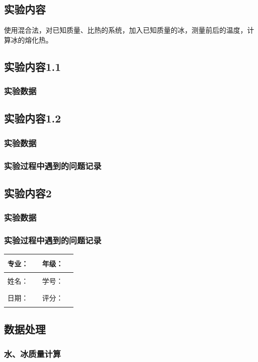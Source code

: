 \documentclass[dvipsnames, svgnames,a4paper,11pt]{article}
\newcommand{\recordblank}[1]{\par\vspace*{#1}\par}
\begin{document}

\subsection{实验内容}
使用混合法，对已知质量、比热的系统，加入已知质量的冰，测量前后的温度，计算冰的熔化热。

\subsection{实验内容1.1}

\subsubsection{实验数据}
\recordblank{5.0cm}
\subsection{实验内容1.2}

\subsubsection{实验数据}
\recordblank{18cm}
\clearpage
\recordblank{13.4cm}
\subsubsection{实验过程中遇到的问题记录}
\recordblank{5.0cm}
\subsection{实验内容2}

\subsubsection{实验数据}
\recordblank{18cm}
\clearpage
\recordblank{9.0cm}
\subsubsection{实验过程中遇到的问题记录}
\recordblank{5.0cm}
\clearpage
\noindent\begin{minipage}{\textwidth}
	\renewcommand\arraystretch{1.7}
	\begin{tabularx}{\textwidth}{|X|X|X|X|}
	\hline
	专业：& \rule{2.5cm}{0.4pt} & 年级：& \rule{2.5cm}{0.4pt}\\
	\hline
	姓名：& \rule{2.5cm}{0.4pt} & 学号：& \rule{2.5cm}{0.4pt}\\
	\hline
	日期：& \rule{2.5cm}{0.4pt} & 评分：& \rule{2.5cm}{0.4pt}\\
	\hline
	\end{tabularx}
\vspace{0.8em}
\subsection{数据处理}
\subsubsection{水、冰质量计算}
\recordblank{3.5cm}
\end{minipage}
\end{document}
